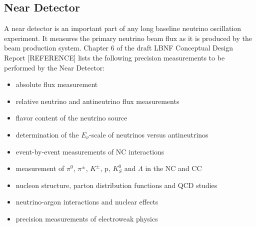 \subsection{Near Detector}


A near detector is an important part of any long baseline neutrino oscillation experiment. It measures the primary neutrino beam flux as it is produced by the beam production system. Chapter 6 of the draft LBNF Conceptual Design Report [REFERENCE] lists the following precision measurements to be performed by the Near Detector: 
\begin{itemize}
  \item absolute flux measurement
  \item relative neutrino and antineutrino flux measurements
  \item flavor content of the neutrino source
  \item determination of the $E_\nu$-scale of neutrinos versus antineutrinos
  \item event-by-event measurements of NC interactions
  \item measurement of $\pi^0$, $\pi^\pm$, $K^\pm$, p, $K^0_S$ and $\Lambda$ in the NC and CC
  \item nucleon structure, parton distribution functions and QCD studies
  \item neutrino-argon interactions and nuclear effects
  \item precision measurements of electroweak physics
\end{itemize}

